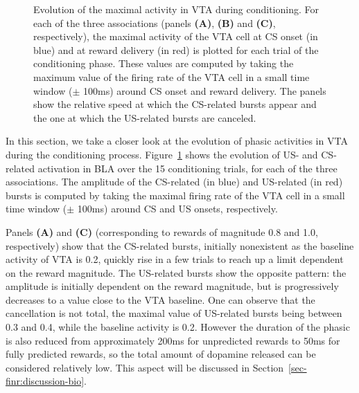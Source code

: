 \documentclass[
  11pt,
  a4paper,
]{scrbook}
\begin{document}
\begin{figure}


\caption{\label{fig-finr:vta_evolution}Evolution of the maximal activity
in VTA during conditioning. For each of the three associations (panels
\textbf{(A)}, \textbf{(B)} and \textbf{(C)}, respectively), the maximal
activity of the VTA cell at CS onset (in blue) and at reward delivery
(in red) is plotted for each trial of the conditioning phase. These
values are computed by taking the maximum value of the firing rate of
the VTA cell in a small time window (\(\pm\) 100ms) around CS onset and
reward delivery. The panels show the relative speed at which the
CS-related bursts appear and the one at which the US-related bursts are
canceled.}

\end{figure}%

In this section, we take a closer look at the evolution of phasic
activities in VTA during the conditioning process.
Figure~\ref{fig-finr:vta_evolution} shows the evolution of US- and
CS-related activation in BLA over the 15 conditioning trials, for each
of the three associations. The amplitude of the CS-related (in blue) and
US-related (in red) bursts is computed by taking the maximal firing rate
of the VTA cell in a small time window (\(\pm\) 100ms) around CS and US
onsets, respectively.

Panels \textbf{(A)} and \textbf{(C)} (corresponding to rewards of
magnitude 0.8 and 1.0, respectively) show that the CS-related bursts,
initially nonexistent as the baseline activity of VTA is 0.2, quickly
rise in a few trials to reach up a limit dependent on the reward
magnitude. The US-related bursts show the opposite pattern: the
amplitude is initially dependent on the reward magnitude, but is
progressively decreases to a value close to the VTA baseline. One can
observe that the cancellation is not total, the maximal value of
US-related bursts being between 0.3 and 0.4, while the baseline activity
is 0.2. However the duration of the phasic is also reduced from
approximately 200ms for unpredicted rewards to 50ms for fully predicted
rewards, so the total amount of dopamine released can be considered
relatively low. This aspect will be discussed in
Section~\ref{sec-finr:discussion-bio}.
\end{document}
